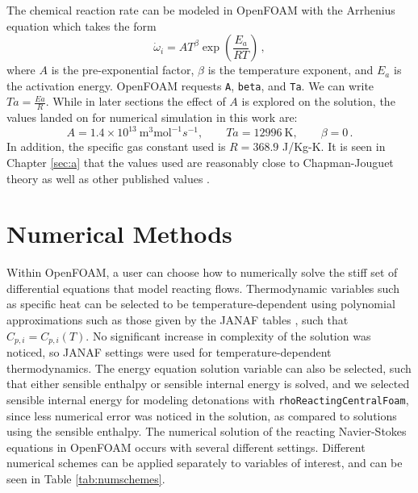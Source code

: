 The chemical reaction rate can be modeled in OpenFOAM with the Arrhenius equation \cite{arrhenius} which takes the form \cite{christ} 
\begin{equation}
\dot{\omega}_i = AT^\beta \exp\left(\frac{E_a}{R T}\right)\,,
\end{equation}
where $A$ is the pre-exponential factor, $\beta$ is the temperature exponent, and $E_a$ is the activation energy. OpenFOAM requests \verb|A|, \verb|beta|, and \verb|Ta|. We can write \(Ta = \frac{Ea}{R }\). While in later sections the effect of \(A\) is explored on the solution, the values landed on for numerical simulation in this work are:
\begin{equation}
   A = 1.4 \times 10^{13} ~ \text{m}^3\text{mol}^{-1}s^{-1},
   \qquad 
   Ta = 12996 ~\text{K},
   \qquad
   \beta = 0\,.
\end{equation}
\noindent In addition, the specific gas constant used is \(R = 368.9\) J/Kg-K. It is seen in Chapter \ref{sec:a} that the values used are reasonably close to Chapman-Jouguet theory as well as other published values \cite{towery1,hashemi}. 

\section{Numerical Methods}
Within OpenFOAM, a user can choose how to numerically solve the stiff set of differential equations that model reacting flows. Thermodynamic variables such as specific heat can be selected to be temperature-dependent using polynomial approximations such as those given by the JANAF tables \cite{janaf}, such that \(C_{p,i} = C_{p,i}(T)\). No significant increase in complexity of the solution was noticed, so JANAF settings were used for temperature-dependent thermodynamics. The energy equation solution variable can also be selected, such that either sensible enthalpy or sensible internal energy is solved, and we selected sensible internal energy for modeling detonations with \verb|rhoReactingCentralFoam|, since less numerical error was noticed in the solution, as compared to solutions using the sensible enthalpy. The numerical solution of the reacting Navier-Stokes equations in OpenFOAM occurs with several different settings. Different numerical schemes can be applied separately to variables of interest, and can be seen in Table \ref{tab:numschemes}. 

